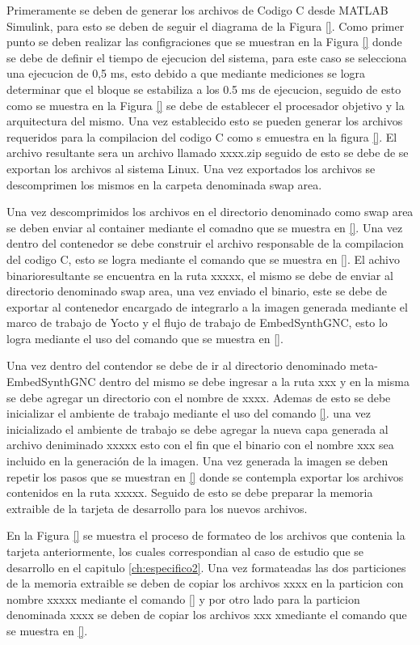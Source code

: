 Primeramente se deben de generar los archivos de Codigo C desde MATLAB Simulink, para esto se deben de seguir el diagrama de la Figura \ref{}. Como primer punto se deben realizar las configraciones que se muestran en la Figura \ref{} donde se debe de definir el tiempo de ejecucion del sistema, para este caso se selecciona una ejecucion de 0,5 ms, esto debido a que mediante mediciones se logra determinar que el bloque se estabiliza a los 0.5 ms de ejecucion, seguido de esto como se muestra en la Figura \ref{} se debe de establecer el procesador objetivo y la arquitectura del mismo. Una vez establecido esto se pueden generar los archivos requeridos para la compilacion del codigo C como s emuestra en la figura \ref{}. El archivo resultante sera un archivo llamado xxxx.zip seguido de esto se debe de  se exportan los archivos al sistema Linux. Una vez exportados los archivos se descomprimen los mismos en la carpeta denominada swap area.

Una vez descomprimidos los archivos en el directorio denominado como swap area se deben enviar al container mediante el comadno que se muestra en \ref{}. Una vez dentro del contenedor se debe construir el archivo responsable de la compilacion del codigo C, esto se logra mediante el comando que se muestra en \ref{}. El achivo binarioresultante se encuentra en la ruta xxxxx, el mismo se debe de enviar al directorio denominado swap area, una vez enviado el binario, este se debe de exportar al contenedor encargado de integrarlo a la imagen generada mediante el marco de trabajo de Yocto y el flujo de trabajo de EmbedSynthGNC, esto lo logra mediante el uso del comando que se muestra en \ref{}. 


Una vez dentro del contendor se debe de ir al directorio denominado meta-EmbedSynthGNC dentro del mismo se debe ingresar a la ruta xxx y en la misma se debe agregar un directorio con el nombre de xxxx. Ademas de esto se debe inicializar el ambiente de trabajo mediante el uso del comando \ref{}. una vez inicializado el ambiente de trabajo se debe agregar la nueva capa generada al archivo deniminado xxxxx esto con el fin que el binario con el nombre xxx sea incluido en la generación de la imagen. Una vez generada la imagen se deben repetir los pasos que se muestran en \ref{} donde se contempla exportar los archivos contenidos en la ruta xxxxx. Seguido de esto se debe preparar la memoria extraible de la tarjeta de desarrollo para los nuevos archivos. 


En la Figura \ref{} se muestra el proceso de formateo de los archivos que contenia la tarjeta anteriormente, los cuales correspondian al caso de estudio que se desarrollo en el capitulo \ref{ch:especifico2}. Una vez formateadas las dos particiones de la memoria extraible se deben de copiar los archivos xxxx en la particion con nombre xxxxx mediante el comando \ref{} y por otro lado para la particion denominada xxxx se deben de copiar los archivos xxx xmediante el comando que se muestra en \ref{}. 


